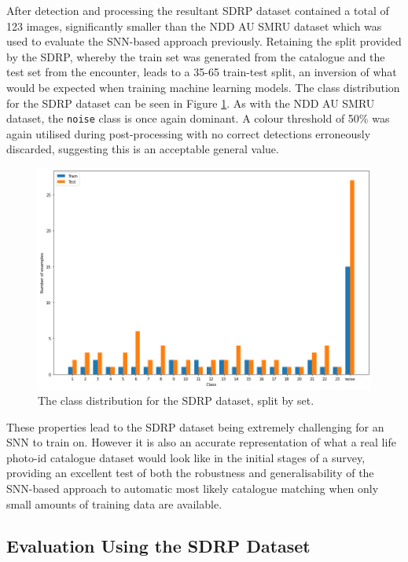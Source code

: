 After detection and processing the resultant SDRP dataset contained a total of 123 images, significantly smaller than the NDD AU SMRU dataset which was used to evaluate the SNN-based approach previously. Retaining the split provided by the SDRP, whereby the train set was generated from the catalogue and the test set from the encounter, leads to a 35-65 train-test split, an inversion of what would be expected when training machine learning models. The class distribution for the SDRP dataset can be seen in Figure \ref{fig:sdrp-dist}. As with the NDD AU SMRU dataset, the \texttt{noise} class is once again dominant. A colour threshold of 50\% was again utilised during post-processing with no correct detections erroneously discarded, suggesting this is an acceptable general value.

\begin{figure}[h]
	\begin{center}
		\includegraphics[scale=0.38]{Chapter6/figs/SDRP-class-dist.png}
	\end{center}
	\caption{The class distribution for the SDRP dataset, split by set.}
	\label{fig:sdrp-dist}
\end{figure}

These properties lead to the SDRP dataset being extremely challenging for an SNN to train on. However it is also an accurate representation of what a real life photo-id catalogue dataset would look like in the initial stages of a survey, providing an excellent test of both the robustness and generalisability of the SNN-based approach to automatic most likely catalogue matching when only small amounts of training data are available. 

\subsection{Evaluation Using the SDRP Dataset}\label{ch:SNNEvaluation,sec:SDRP,sub:SNNEvalWithSDRP}

